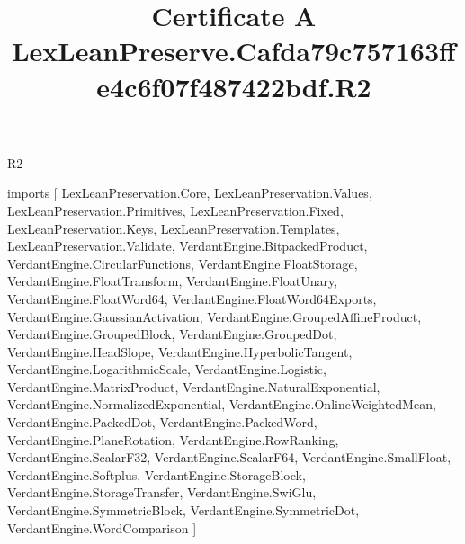 \begin{lexlean}{R2}
\title{Certificate A LexLeanPreserve.Cafda79c757163ffe4c6f07f487422bdf.R2}
\begin{coremodule}
imports [
  LexLeanPreservation.Core,
  LexLeanPreservation.Values,
  LexLeanPreservation.Primitives,
  LexLeanPreservation.Fixed,
  LexLeanPreservation.Keys,
  LexLeanPreservation.Templates,
  LexLeanPreservation.Validate,
  VerdantEngine.BitpackedProduct,
  VerdantEngine.CircularFunctions,
  VerdantEngine.FloatStorage,
  VerdantEngine.FloatTransform,
  VerdantEngine.FloatUnary,
  VerdantEngine.FloatWord64,
  VerdantEngine.FloatWord64Exports,
  VerdantEngine.GaussianActivation,
  VerdantEngine.GroupedAffineProduct,
  VerdantEngine.GroupedBlock,
  VerdantEngine.GroupedDot,
  VerdantEngine.HeadSlope,
  VerdantEngine.HyperbolicTangent,
  VerdantEngine.LogarithmicScale,
  VerdantEngine.Logistic,
  VerdantEngine.MatrixProduct,
  VerdantEngine.NaturalExponential,
  VerdantEngine.NormalizedExponential,
  VerdantEngine.OnlineWeightedMean,
  VerdantEngine.PackedDot,
  VerdantEngine.PackedWord,
  VerdantEngine.PlaneRotation,
  VerdantEngine.RowRanking,
  VerdantEngine.ScalarF32,
  VerdantEngine.ScalarF64,
  VerdantEngine.SmallFloat,
  VerdantEngine.Softplus,
  VerdantEngine.StorageBlock,
  VerdantEngine.StorageTransfer,
  VerdantEngine.SwiGlu,
  VerdantEngine.SymmetricBlock,
  VerdantEngine.SymmetricDot,
  VerdantEngine.WordComparison
]


\end{coremodule}
\end{lexlean}
